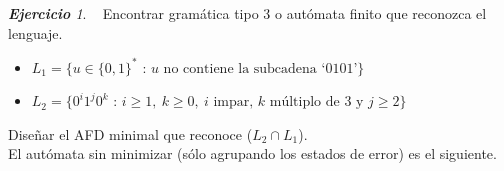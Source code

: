 \documentclass[12pt,spanish]{article}
\theoremstyle{definition}
\theoremstyle{remark}
\newtheorem{exercise}{\textbf{Ejercicio}}%
\begin{document}
\begin{exercise}~ Encontrar gramática tipo 3 o autómata finito que reconozca el lenguaje.

  \begin{itemize}
  \item $L_1=\{u\in\{0,1\}^*\text{ : $u$ no contiene la subcadena `0101'}\}$

    \begin{figure}[H]
      \centering
    \end{figure}
  \item $L_2=\{0^i1^j0^k\text{ : $i\geq 1, \ k\geq 0, \ i$ impar, $k$ múltiplo de 3 y $j\geq 2$}\}$

    \begin{figure}[H]
      \centering
    \end{figure}
  \end{itemize}

  Diseñar el AFD minimal que reconoce ($L_2\cap L_1$). \\

  El autómata sin minimizar (sólo agrupando los estados de error) es
  el siguiente.
  
  \begin{figure}[H]
    \centering
  \end{figure}
  

\end{exercise}
\end{document}
